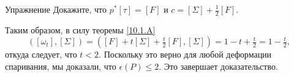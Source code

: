 \begin{ex*}{Упражнение}
Докажите, что $p^\ast [\tau] = [F]$ и $c = [\Sigma] + \tfrac12 [F]$.
\end{ex*}

Таким образом, в силу теоремы \ref{10.1.A}
\[([\omega_t], [\Sigma]) = ([F] + t[\Sigma] + \tfrac t2[F], [\Sigma]) = 1 - t + \tfrac t2= 1 -\tfrac t2,\]
откуда следует, что $t < 2$.
Поскольку это верно для любой деформации спаривания, мы доказали, что $\epsilon(P)\le2$.
Это завершает доказательство.
\qeds
